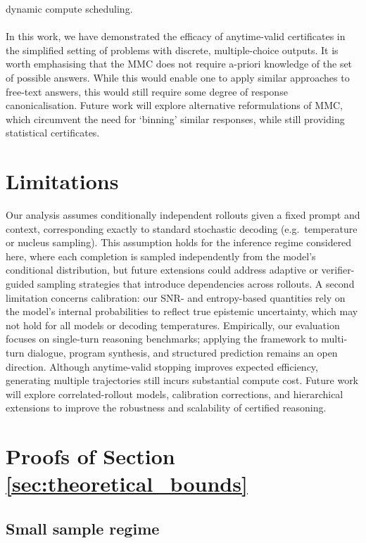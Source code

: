 \documentclass{article} %
\begin{document}
dynamic compute scheduling.   
\\\\
In this work, we have demonstrated the efficacy of anytime-valid certificates in the simplified setting of problems with discrete, multiple-choice outputs.   It is worth emphasising that the MMC does not require a-priori knowledge of the set of possible answers. While this would enable one to apply similar approaches to free-text answers, this would still require some degree of response canonicalisation.  Future work will explore alternative reformulations of MMC, which circumvent the need for `binning' similar responses, while still providing statistical certificates.

\section{Limitations}\label{app:limitations}
Our analysis assumes conditionally independent rollouts given a fixed prompt
and context, corresponding exactly to standard stochastic decoding (e.g.\
temperature or nucleus sampling).  This assumption holds for the inference
regime considered here, where each completion is sampled independently from the
model’s conditional distribution, but future extensions could address adaptive
or verifier-guided sampling strategies that introduce dependencies across
rollouts.  A second limitation concerns calibration: our SNR- and
entropy-based quantities rely on the model’s internal probabilities to reflect
true epistemic uncertainty, which may not hold for all models or decoding
temperatures.  Empirically, our evaluation focuses on single-turn reasoning
benchmarks; applying the framework to multi-turn dialogue, program synthesis,
and structured prediction remains an open direction.  Although
anytime-valid stopping improves expected efficiency, generating multiple
trajectories still incurs substantial compute cost.  Future work will explore
correlated-rollout models, calibration corrections, and hierarchical extensions
to improve the robustness and scalability of certified reasoning. 

\newpage



\newpage
\appendix
\section{Proofs of Section \ref{sec:theoretical_bounds}}\label{app:proofs_for_theoretical_bounds}

\subsection{Small sample regime}\label{app:small_regime_bounds}

\end{document}
